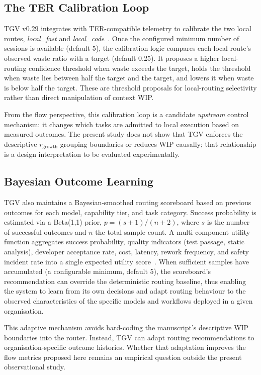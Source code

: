\documentclass[journal]{IEEEtran}
\begin{document}
\subsection{The TER Calibration Loop}

TGV v0.29 integrates with TER-compatible telemetry to calibrate the two local routes, \emph{local\_fast} and \emph{local\_code}~\cite{griffin2026ter, griffin2026tgv}. Once the configured minimum number of sessions is available (default 5), the calibration logic compares each local route's observed waste ratio with a target (default 0.25). It proposes a higher local-routing confidence threshold when waste exceeds the target, holds the threshold when waste lies between half the target and the target, and lowers it when waste is below half the target. These are threshold proposals for local-routing selectivity rather than direct manipulation of context WIP.

From the flow perspective, this calibration loop is a candidate \emph{upstream} control mechanism: it changes which tasks are admitted to local execution based on measured outcomes. The present study does not show that TGV enforces the descriptive $r_{\text{growth}}$ grouping boundaries or reduces WIP causally; that relationship is a design interpretation to be evaluated experimentally.

\subsection{Bayesian Outcome Learning}

TGV also maintains a Bayesian-smoothed routing scoreboard based on previous outcomes for each model, capability tier, and task category. Success probability is estimated via a Beta(1,1) prior, $p = (s+1)/(n+2)$, where $s$ is the number of successful outcomes and $n$ the total sample count. A multi-component utility function aggregates success probability, quality indicators (test passage, static analysis), developer acceptance rate, cost, latency, rework frequency, and safety incident rate into a single expected utility score~\cite{griffin2026tgv}. When sufficient samples have accumulated (a configurable minimum, default 5), the scoreboard's recommendation can override the deterministic routing baseline, thus enabling the system to learn from its own decisions and adapt routing behaviour to the observed characteristics of the specific models and workflows deployed in a given organisation.

This adaptive mechanism avoids hard-coding the manuscript's descriptive WIP boundaries into the router. Instead, TGV can adapt routing recommendations to organisation-specific outcome histories. Whether that adaptation improves the flow metrics proposed here remains an empirical question outside the present observational study.
\end{document}
